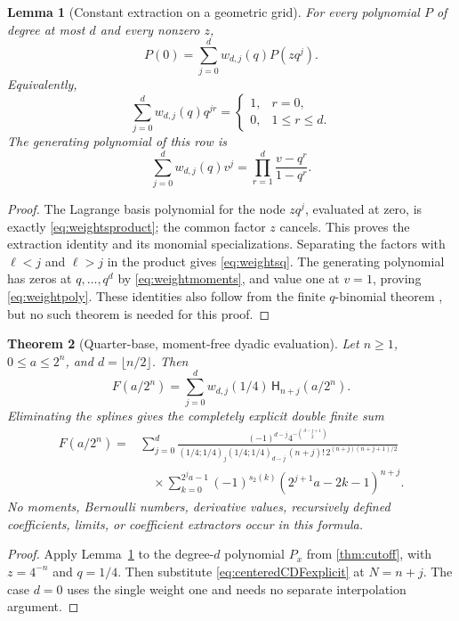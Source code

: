 \documentclass[11pt,oneside]{article}
\newtheorem{theorem}{Theorem}[section]
\newtheorem{lemma}[theorem]{Lemma}
\theoremstyle{definition}\newtheorem{definition}[theorem]{Definition}
\theoremstyle{remark}\newtheorem{remark}[theorem]{Remark}
\newcommand{\wt}{s_2}\newcommand{\D}{\mathrm D}
\begin{document}
\begin{lemma}[Constant extraction on a geometric grid]
\label{lem:weights}
For every polynomial $P$ of degree at most $d$ and every nonzero $z$,
\begin{equation}
 P(0)=\sum_{j=0}^{d}w_{d,j}(q)P(zq^j).
 \label{eq:geometricextract}
\end{equation}
Equivalently,
\begin{equation}
 \sum_{j=0}^{d}w_{d,j}(q)q^{jr}=\begin{cases}1,&r=0,\\0,&1\le r\le d.
 \end{cases}
 \label{eq:weightmoments}
\end{equation}
The generating polynomial of this row is
\begin{equation}
 \sum_{j=0}^{d}w_{d,j}(q)v^j
 =\prod_{r=1}^{d}\frac{v-q^r}{1-q^r}.
 \label{eq:weightpoly}
\end{equation}
\end{lemma}
\begin{proof}
The Lagrange basis polynomial for the node $zq^j$, evaluated at zero, is
exactly \eqref{eq:weightsproduct}; the common factor $z$ cancels. This
proves the extraction identity and its monomial specializations. Separating
the factors with $\ell<j$ and $\ell>j$ in the product gives
\eqref{eq:weightsq}. The generating polynomial has zeros at $q,\ldots,q^d$
by \eqref{eq:weightmoments}, and value one at $v=1$, proving
\eqref{eq:weightpoly}. These identities also follow from the finite
$q$-binomial theorem \cite[\S17.2]{dlmfq}, but no such theorem is needed
for this proof.
\end{proof}

\begin{theorem}[Quarter-base, moment-free dyadic evaluation]
\label{thm:quarter}
Let $n\ge1$, $0\le a\le2^n$, and $d=\lfloor n/2\rfloor$. Then
\begin{equation}
 \boxed{\displaystyle
 F(a/2^n)=\sum_{j=0}^{d}w_{d,j}(1/4)\,
                 \mathsf H_{n+j}(a/2^n).}
 \label{eq:quarterextract}
\end{equation}
Eliminating the splines gives the completely explicit double finite sum
\begin{equation}
 \boxed{\begin{aligned}
 F(a/2^n)={}&\sum_{j=0}^{d}
 \frac{(-1)^{d-j}4^{-\binom{d-j+1}{2}}}
 {(1/4;1/4)_j(1/4;1/4)_{d-j}\,(n+j)!\,2^{(n+j)(n+j+1)/2}}\\[-0.1em]
 &\hspace{1em}\times
 \sum_{k=0}^{2^j a-1}(-1)^{\wt(k)}
       (2^{j+1}a-2k-1)^{n+j}.
 \end{aligned}}
 \label{eq:quarterclosed}
\end{equation}
No moments, Bernoulli numbers, derivative values, recursively defined
coefficients, limits, or coefficient extractors occur in this formula.
\end{theorem}
\begin{proof}
Apply Lemma~\ref{lem:weights} to the degree-$d$ polynomial $P_x$ from
\cref{thm:cutoff}, with $z=4^{-n}$ and $q=1/4$.
Then substitute \eqref{eq:centeredCDFexplicit} at $N=n+j$.
The case $d=0$ uses the single weight one and needs no separate
interpolation argument.
\end{proof}
\end{document}
